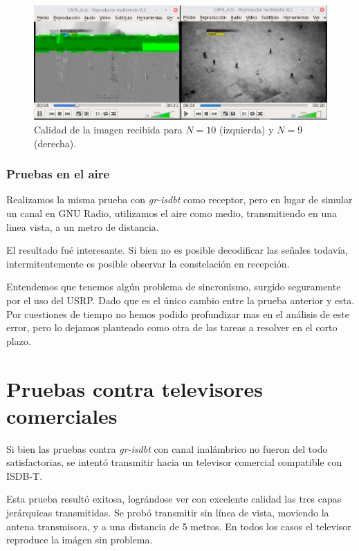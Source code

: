 \begin{figure}[!h]
	\centering
	\includegraphics[scale=0.4]{figuras/cap06/calidad_imagen}
	\caption{\label{f:calidad_imagen} Calidad de la imagen recibida para $N=10$ (izquierda) y $N=9$ (derecha).}
\end{figure}

\subsubsection{Pruebas en el aire}

Realizamos la misma prueba con \textit{gr-isdbt} como receptor, pero en lugar de simular un canal en GNU Radio, utilizamos el aire como medio, transmitiendo en una linea vista, a un metro de distancia.

El resultado fué interesante. Si bien no es posible decodificar las señales todavía, intermitentemente es posible observar la constelación en recepción. 

Entendemos que tenemos algún problema de sincronismo, surgido seguramente por el uso del USRP. Dado que es el único cambio entre la prueba anterior y esta. Por cuestiones de tiempo no hemos podido profundizar mas en el análisis de este error, pero lo dejamos planteado como otra de las tareas a resolver en el corto plazo.
 

\section{Pruebas contra televisores comerciales}

Si bien las pruebas contra \textit{gr-isdbt} con canal inalámbrico no fueron del todo satisfactorias, se intentó transmitir hacia un televisor comercial compatible con ISDB-T. 

Esta prueba resultó exitosa, lográndose ver con excelente calidad las tres capas jerárquicas transmitidas. Se probó transmitir sin línea de vista, moviendo la antena transmisora, y a una distancia de 5 metros. En todos los casos el televisor reproduce la imágen sin problema.

